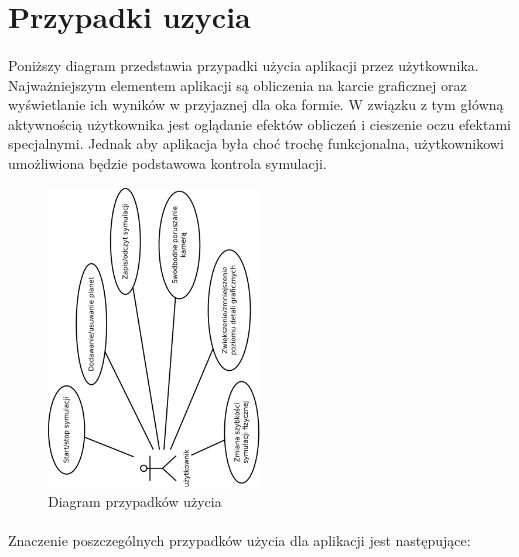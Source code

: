 \section{Przypadki uzycia}\label{sec:usecase}

\paragraph{}

Poniższy diagram przedstawia przypadki użycia aplikacji przez użytkownika. Najważniejszym elementem aplikacji są obliczenia na karcie graficznej oraz wyświetlanie ich wyników w przyjaznej dla oka formie. W związku z tym główną aktywnością użytkownika jest oglądanie efektów obliczeń i cieszenie oczu efektami specjalnymi. Jednak aby aplikacja była choć trochę funkcjonalna, użytkownikowi umożliwiona będzie podstawowa kontrola symulacji.

\begin{figure}[h]
	\centering
	\includegraphics[width=0.5\textwidth,angle=-90]{use-case.pdf}
	\caption{Diagram przypadków użycia}
	\label{fig:use-case}
\end{figure}

\paragraph{}

Znaczenie poszczególnych przypadków użycia dla aplikacji jest następujące:

